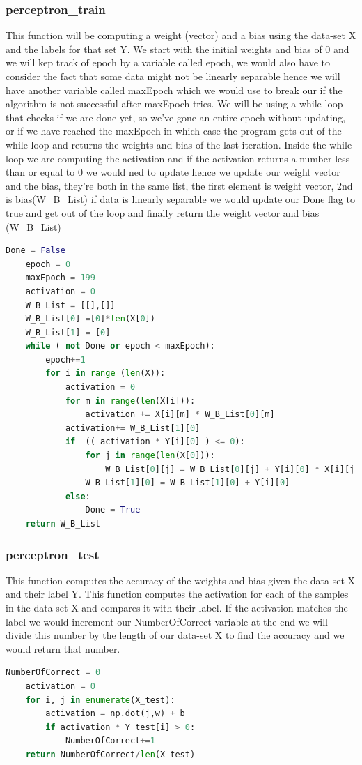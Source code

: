 \documentclass{article}
\begin{document}
	\subsubsection{perceptron\_train}
	This function will be computing a weight (vector) and a bias using the data-set X and the labels for that set Y. We start with the initial weights and bias of 0 and we will kep track of epoch by a variable called epoch, we would also have to consider the fact that some data might not be linearly separable hence we will have another variable called maxEpoch which we would use to break our if the algorithm is not successful after maxEpoch tries. We will be using a while loop that checks if we are done yet, so we've gone an entire epoch without updating, or if we have reached the maxEpoch in which case the program gets out of the while loop and returns the weights and bias of the last iteration. Inside the while loop we are computing the activation and if the activation returns a number less than or equal to 0 we would ned to update hence we update our weight vector and the bias, they're both in the same list, the first element is weight vector, 2nd is bias(W\_B\_List) if data is linearly separable we would update our Done flag to true and get out of the loop and finally return the weight vector and bias (W\_B\_List)
	\begin{lstlisting}[language=Python]
	Done = False 
	epoch = 0 
	maxEpoch = 199
	activation = 0 
	W_B_List = [[],[]] 
	W_B_List[0] =[0]*len(X[0]) 
	W_B_List[1] = [0]
	while ( not Done or epoch < maxEpoch): 
		epoch+=1
		for i in range (len(X)):
			activation = 0
			for m in range(len(X[i])):
				activation += X[i][m] * W_B_List[0][m]
			activation+= W_B_List[1][0]
			if  (( activation * Y[i][0] ) <= 0):
				for j in range(len(X[0])):
					W_B_List[0][j] = W_B_List[0][j] + Y[i][0] * X[i][j]
				W_B_List[1][0] = W_B_List[1][0] + Y[i][0]
			else:
				Done = True 
	return W_B_List
	\end{lstlisting}
	
	\subsubsection{perceptron\_test}
	This function computes the accuracy of the weights and bias given the data-set X and their label Y. This function computes the activation for each of the samples in the data-set X and compares it with their label. If the activation matches the label we would increment our NumberOfCorrect variable at the end we will divide this number by the length of our data-set X to find the accuracy and we would return that number. 
	\begin{lstlisting}[language=Python]
	NumberOfCorrect = 0
	activation = 0
	for i, j in enumerate(X_test):
		activation = np.dot(j,w) + b 
		if activation * Y_test[i] > 0:
			NumberOfCorrect+=1
	return NumberOfCorrect/len(X_test)
	\end{lstlisting}
	 
\end{document}
